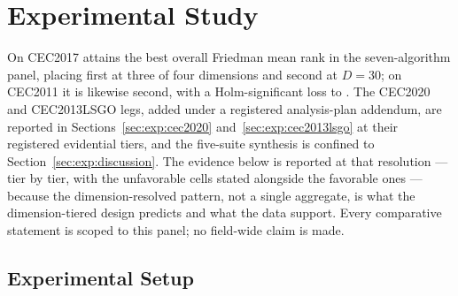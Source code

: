 \section{Experimental Study}\label{sec:experiments}

On CEC2017 \dtgsk{} attains the best overall Friedman
mean rank in the seven-algorithm panel, placing first at three of four
dimensions and second at $D = 30$; on CEC2011 it is likewise second, with
a Holm-significant loss to \egsk{}. The CEC2020 and CEC2013LSGO legs,
added under a registered analysis-plan addendum, are reported in
Sections~\ref{sec:exp:cec2020} and~\ref{sec:exp:cec2013lsgo} at their
registered evidential tiers, and the five-suite synthesis is confined to
Section~\ref{sec:exp:discussion}. The evidence below is reported at that
resolution --- tier by tier, with the unfavorable cells stated alongside
the favorable ones --- because the dimension-resolved pattern, not a single
aggregate, is what the dimension-tiered design predicts and what the data
support. Every comparative statement is scoped to this panel; no
field-wide claim is made.

\subsection{Experimental Setup}\label{sec:exp:settings}


